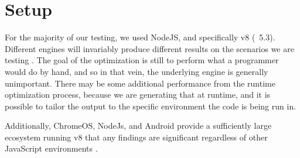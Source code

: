 \section{Setup}

For the majority of our testing, we used NodeJS, and specifically v8 (~5.3). Different engines will invariably produce different results on the scenarios we are testing \cite{TODO}.  The goal of the optimization is still to perform what a programmer would do by hand, and so in that vein, the underlying engine is generally unimportant.  There may be some additional performance from the runtime optimization process, because we are generating that at runtime, and it is possible to tailor the output to the specific environment the code is being run in.

Additionally, ChromeOS, NodeJs, and Android provide a sufficiently large ecosystem running v8 that any findings are significant regardless of other JavaScript environments \cite{TODO}.

